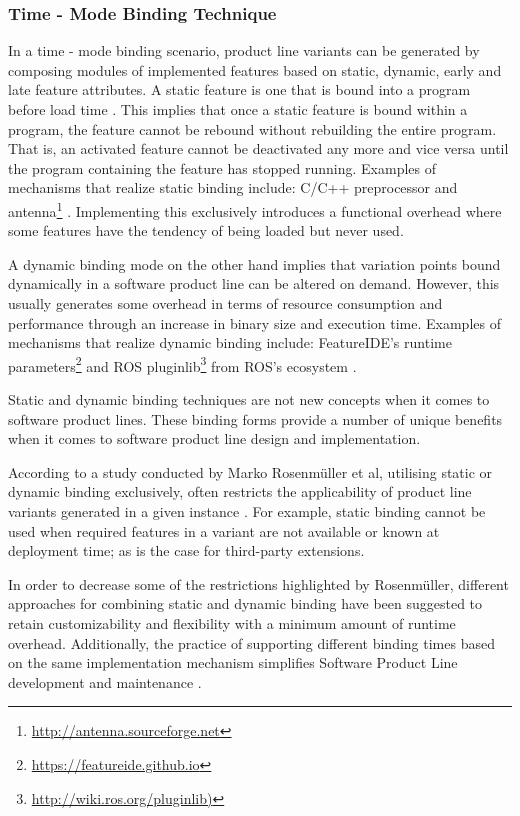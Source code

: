 \documentclass[conference]{IEEEtran}
\newcommand{\foot}[1]{\footnote{\url{#1}}}
\begin{document}
\subsubsection{Time - Mode Binding Technique}
In a time - mode binding scenario, product line variants can be generated by composing modules of implemented features based on static, dynamic, early and late feature attributes. A static feature is one that is bound into a program before load time \cite{flex-feat-bind}. This implies that once a static feature is bound within a program, the feature cannot be rebound without rebuilding the entire program. That is, an activated feature cannot be deactivated any more and vice versa until the program containing the feature has stopped running. Examples of mechanisms that realize static binding include: C/C++ preprocessor and antenna\foot{http://antenna.sourceforge.net} \cite{flex-feat-bind}. Implementing this exclusively introduces a functional overhead where some features have the tendency of being loaded but never used.

A dynamic binding mode on the other hand implies that variation points bound dynamically in a software product line can be altered on demand. However, this usually generates some overhead in terms of resource consumption and performance through an increase in binary size and execution time. Examples of mechanisms that realize dynamic binding include: FeatureIDE's runtime parameters\foot{https://featureide.github.io} and ROS pluginlib\foot{http://wiki.ros.org/pluginlib)} from ROS's ecosystem \cite{flex-feat-bind}.

Static and dynamic binding techniques are not new concepts when it comes to software product lines. These binding forms provide a number of unique benefits when it comes to software product line design and implementation. 

According to a study conducted by Marko Rosenmüller et al, utilising static or dynamic binding exclusively, often restricts the applicability of product line variants generated in a given instance \cite{flex-feat-bind}. For example, static binding cannot be used when required features in a variant are not available or known at deployment time; as is the case for third-party extensions. 

In order to decrease some of the restrictions highlighted by Rosenmüller, different approaches for combining static and dynamic binding have been suggested to retain customizability and flexibility with a minimum amount of runtime overhead. Additionally, the practice of supporting different binding times based on the same implementation mechanism simplifies Software Product Line development and maintenance \cite{flex-feat-bind}.
\end{document}
